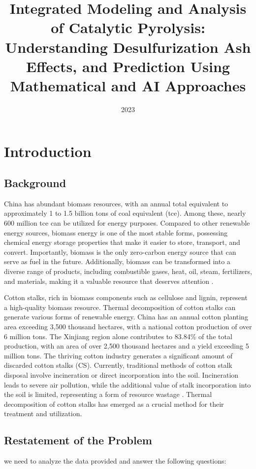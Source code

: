 \documentclass{swmcmthesis}
\title{Integrated Modeling and Analysis of Catalytic Pyrolysis: Understanding Desulfurization Ash Effects, and Prediction Using Mathematical and AI Approaches} %
\date{2023}
\begin{document}
\maketitle
\tableofcontents

\newpage

\section{Introduction}
\subsection{Background}


China has abundant biomass resources, with an annual total equivalent to approximately 1 to 1.5 billion tons of coal equivalent (tce). Among these, nearly 600 million tce can be utilized for energy purposes. Compared to other renewable energy sources, biomass energy is one of the most stable forms, possessing chemical energy storage properties that make it easier to store, transport, and convert. Importantly, biomass is the only zero-carbon energy source that can serve as fuel in the future. Additionally, biomass can be transformed into a diverse range of products, including combustible gases, heat, oil, steam, fertilizers, and materials, making it a valuable resource that deserves attention \cite{bib1}.

Cotton stalks, rich in biomass components such as cellulose and lignin, represent a high-quality biomass resource. Thermal decomposition of cotton stalks can generate various forms of renewable energy. China has an annual cotton planting area exceeding 3,500 thousand hectares, with a national cotton production of over 6 million tons. The Xinjiang region alone contributes to 83.84\% of the total production, with an area of over 2,500 thousand hectares and a yield exceeding 5 million tons. The thriving cotton industry generates a significant amount of discarded cotton stalks (CS). Currently, traditional methods of cotton stalk disposal involve incineration or direct incorporation into the soil. Incineration leads to severe air pollution, while the additional value of stalk incorporation into the soil is limited, representing a form of resource wastage \cite{bib2}. Thermal decomposition of cotton stalks has emerged as a crucial method for their treatment and utilization.
\subsection{Restatement of the Problem}
    we need to analyze the data provided and answer the following questions:
\end{document}
